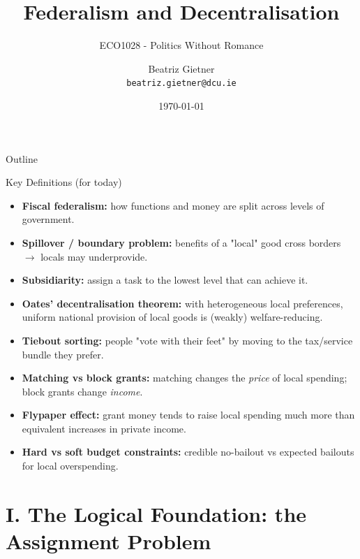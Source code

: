 \documentclass[10pt]{beamer}
\title{Federalism and Decentralisation}
\subtitle{ECO1028 - Politics Without Romance}
\author{Beatriz Gietner\\
\texttt{beatriz.gietner@dcu.ie}}
\date{\today}
\begin{document}
\maketitle

\begin{frame}{Outline}
\tableofcontents
\end{frame}

\begin{frame}{Key Definitions (for today)}
\small
\begin{itemize}
\item \textbf{Fiscal federalism:} how functions and money are split across levels of government.
\item \textbf{Spillover / boundary problem:} benefits of a "local" good cross borders $\rightarrow$ locals may underprovide.
\item \textbf{Subsidiarity:} assign a task to the lowest level that can achieve it.
\item \textbf{Oates' decentralisation theorem:} with heterogeneous local preferences, uniform national provision of local goods is (weakly) welfare-reducing.
\item \textbf{Tiebout sorting:} people "vote with their feet" by moving to the tax/service bundle they prefer.
\item \textbf{Matching vs block grants:} matching changes the \textit{price} of local spending; block grants change \textit{income}.
\item \textbf{Flypaper effect:} grant money tends to raise local spending much more than equivalent increases in private income.
\item \textbf{Hard vs soft budget constraints:} credible no-bailout vs expected bailouts for local overspending.
\end{itemize}
\end{frame}


\section{I. The Logical Foundation: the Assignment Problem}
\end{document}
